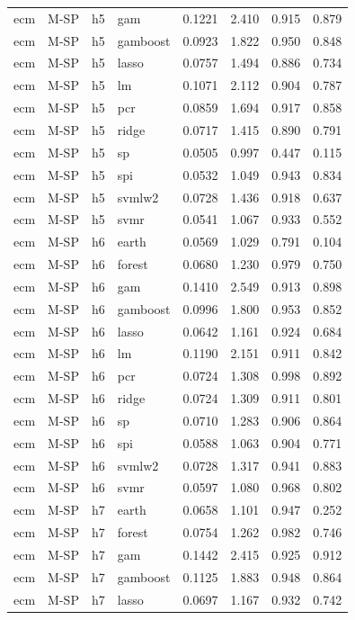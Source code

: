 \begin{ThreePartTable}
\begin{longtable}[t]{llclcccc}
ecm & M-SP & h5 & gam & 0.1221 & 2.410 & 0.915 & 0.879\\
ecm & M-SP & h5 & gamboost & 0.0923 & 1.822 & 0.950 & 0.848\\
ecm & M-SP & h5 & lasso & 0.0757 & 1.494 & 0.886 & 0.734\\
ecm & M-SP & h5 & lm & 0.1071 & 2.112 & 0.904 & 0.787\\
ecm & M-SP & h5 & pcr & 0.0859 & 1.694 & 0.917 & 0.858\\
ecm & M-SP & h5 & ridge & 0.0717 & 1.415 & 0.890 & 0.791\\
ecm & M-SP & h5 & sp & 0.0505 & 0.997 & 0.447 & 0.115\\
ecm & M-SP & h5 & spi & 0.0532 & 1.049 & 0.943 & 0.834\\
ecm & M-SP & h5 & svmlw2 & 0.0728 & 1.436 & 0.918 & 0.637\\
ecm & M-SP & h5 & svmr & 0.0541 & 1.067 & 0.933 & 0.552\\
\addlinespace
ecm & M-SP & h6 & earth & 0.0569 & 1.029 & 0.791 & 0.104\\
ecm & M-SP & h6 & forest & 0.0680 & 1.230 & 0.979 & 0.750\\
ecm & M-SP & h6 & gam & 0.1410 & 2.549 & 0.913 & 0.898\\
ecm & M-SP & h6 & gamboost & 0.0996 & 1.800 & 0.953 & 0.852\\
ecm & M-SP & h6 & lasso & 0.0642 & 1.161 & 0.924 & 0.684\\
ecm & M-SP & h6 & lm & 0.1190 & 2.151 & 0.911 & 0.842\\
ecm & M-SP & h6 & pcr & 0.0724 & 1.308 & 0.998 & 0.892\\
ecm & M-SP & h6 & ridge & 0.0724 & 1.309 & 0.911 & 0.801\\
ecm & M-SP & h6 & sp & 0.0710 & 1.283 & 0.906 & 0.864\\
ecm & M-SP & h6 & spi & 0.0588 & 1.063 & 0.904 & 0.771\\
ecm & M-SP & h6 & svmlw2 & 0.0728 & 1.317 & 0.941 & 0.883\\
ecm & M-SP & h6 & svmr & 0.0597 & 1.080 & 0.968 & 0.802\\
\addlinespace
ecm & M-SP & h7 & earth & 0.0658 & 1.101 & 0.947 & 0.252\\
ecm & M-SP & h7 & forest & 0.0754 & 1.262 & 0.982 & 0.746\\
ecm & M-SP & h7 & gam & 0.1442 & 2.415 & 0.925 & 0.912\\
ecm & M-SP & h7 & gamboost & 0.1125 & 1.883 & 0.948 & 0.864\\
ecm & M-SP & h7 & lasso & 0.0697 & 1.167 & 0.932 & 0.742\\

\end{longtable}
\end{ThreePartTable}
